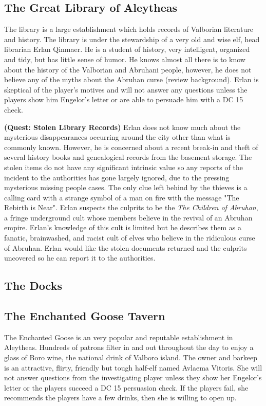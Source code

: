 \begin{multicols*}{2}
\subsection{The Great Library of Aleytheas}
The library is a large establishment which holds records of Valborian literature and history. The library is under the stewardship of a very old and wise elf, head librarian Erlan Qinmaer. He is a student of history, very intelligent, organized and tidy, but has little sense of humor. He knows almost all there is to know about the history of the Valborian and Abruhani people, however, he does not believe any of the myths about the Abruhan curse (review background). Erlan is skeptical of the player's motives and will not answer any questions unless the players show him Engelor's letter or are able to persuade him with a DC 15 check.

\textbf{(Quest: Stolen Library Records)} Erlan does not know much about the mysterious disappearances occurring around the city other than what is commonly known. However, he is concerned about a recent break-in and theft of several history books and genealogical records from the basement storage. The stolen items do not have any significant intrinsic value so any reports of the incident to the authorities has gone largely ignored, due to the pressing mysterious missing people cases. The only clue left behind by the thieves is a calling card with a strange symbol of a man on fire with the message "The Rebirth is Near". Erlan suspects the culprits to be the \emph{The Children of Abruhan}, a fringe underground cult whose members believe in the revival of an Abruhan empire. Erlan's knowledge of this cult is limited but he describes them as a fanatic, brainwashed, and racist cult of elves who believe in the ridiculous curse of Abruhan. Erlan would like the stolen documents returned and the culprits uncovered so he can report it to the authorities.  

\subsection{The Docks}

\subsection{The Enchanted Goose Tavern}
The Enchanted Goose is an very popular and reputable establishment in Aleytheas. Hundreds of patrons filter in and out throughout the day to enjoy a glass of Boro wine, the national drink of Valboro island. The owner and barkeep is an attractive, flirty, friendly but tough half-elf named Avlaema Vitoris. She will not answer questions from the investigating player unless they show her Engelor's letter or the players succeed a DC 15 persuasion check. If the players fail, she recommends the players have a few drinks, then she is willing to open up.


\end{multicols*}
